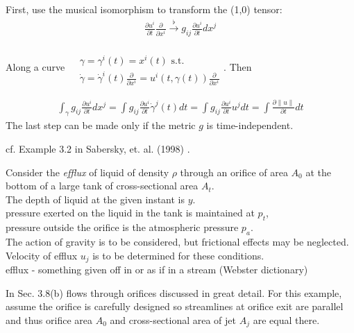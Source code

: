 First, use the musical isomorphism to transform the (1,0) tensor:
\[
\begin{gathered}
\frac{ \partial u^i}{\partial t}\frac{\partial}{\partial x^i} \xrightarrow{\flat} g_{ij} \frac{\partial u^i}{\partial t} dx^j
\end{gathered}
\]

Along a curve $\begin{aligned} & \quad \\ 
& \gamma = \gamma^i(t) = x^i(t) \text{ s.t. } \\
& \dot{\gamma} = \dot{\gamma}^i(t) \frac{ \partial}{\partial x^i} = u^i(t, \gamma(t)) \frac{\partial}{\partial x^i}
\end{aligned}$. Then

\[
\begin{gathered}
\int_{\gamma} g_{ij} \frac{\partial u^i}{\partial t} dx^j = \int g_{ij} \frac{\partial u^i}{\partial t} \dot{\gamma}^j(t) dt = \int g_{ij} \frac{\partial u^i}{\partial t} u^j dt = \int \frac{\partial \| u \| }{ \partial t} dt 
\end{gathered}
\]
The last step can be made only if the metric $g$ is time-independent.

cf. Example 3.2 in Sabersky, et. al. (1998) \cite{dgdt:SAHG1998}. 

Consider the \emph{efflux} of liquid of density $\rho$ through an orifice of area $A_0$ at the bottom of a large tank of cross-sectional area $A_t$. \\
The depth of liquid at the given instant is $y$. \\
pressure exerted on the liquid in the tank is maintained at $p_t$, \\
pressure outside the orifice is the atmospheric pressure $p_a$. \\

The action of gravity is to be considered, but frictional effects may be neglected. Velocity of efflux $u_j$ is to be determined for these conditions. \\

efflux - something given off in or as if in a stream (Webster dictionary)


In Sec. 3.8(b) flows through orifices discussed in great detail. For this example, \\
assume the orifice is carefully designed so streamlines at orifice exit are parallel and thus orifice area $A_0$ and cross-sectional area of jet $A_j$ are equal there.



